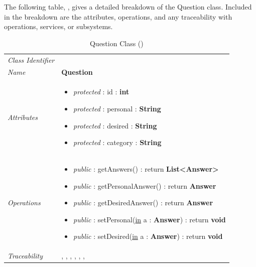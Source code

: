 \documentclass[12pt,letterpaper]{article}
\begin{document}
The following table, , gives a detailed breakdown of the Question class. Included in the breakdown are the attributes, operations, and any traceability with operations, services, or subsystems.

\begin{table}[H]
    \caption{Question Class ()} 
	\begin{tabu} to 
		\toprule
		Class Identifier &  \\
		Name & {\bf Question} \\
		Attributes & 
		\begin{minipage}[t]{\linewidth}
		    \begin{itemize}
		        \item \textit{protected} : id : {\bf int}
		        \item \textit{protected} : personal : {\bf String}
		        \item \textit{protected} : desired : {\bf String}
		        \item \textit{protected} : category : {\bf String}
			\end{itemize}
	    \end{minipage} \\

		Operations &
		\begin{minipage}[t]{\linewidth}
			\begin{itemize}
			    \item {\it public} : getAnswers() : return {\bf List<Answer>}
			    \item {\it public} : getPersonalAnswer() : return {\bf Answer}
			    \item {\it public} : getDesiredAnswer() : return {\bf Answer}
			    \item {\it public} : setPersonal(\underline{in} a : {\bf Answer}) : return {\bf void}
			    \item {\it public} : setDesired(\underline{in} a : {\bf Answer}) : return {\bf void}
	        \end{itemize}
	    \end{minipage} \\
	    	Traceability & , , , , , , \\
		\toprule
	\end{tabu}
\end{table}
\end{document}
